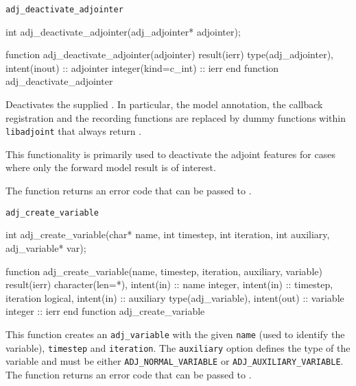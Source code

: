 \begin{boxwithtitle}{\texttt{adj_deactivate_adjointer}}
\begin{minipage}{\columnwidth}
\begin{ccode}
  int adj_deactivate_adjointer(adj_adjointer* adjointer);
\end{ccode}
\begin{fortrancode}
  function adj_deactivate_adjointer(adjointer) result(ierr) 
    type(adj_adjointer), intent(inout) :: adjointer
    integer(kind=c_int) :: ierr
  end function adj_deactivate_adjointer
\end{fortrancode}
\end{minipage}
\end{boxwithtitle}

Deactivates the supplied .
In particular, the model annotation, the callback registration and the recording functions are replaced by dummy functions within \texttt{libadjoint} that always return .

This functionality is primarily used to deactivate the adjoint features for cases where only the forward model result is of interest.

The function returns an error code that can be passed to .


\begin{boxwithtitle}{\texttt{adj_create_variable}}
\begin{minipage}{\columnwidth}
\begin{ccode}
  int adj_create_variable(char* name, int timestep, int iteration, int auxiliary, 
                          adj_variable* var);
\end{ccode}
\begin{fortrancode}
  function adj_create_variable(name, timestep, iteration, auxiliary, variable) 
           result(ierr)
    character(len=*), intent(in) :: name
    integer, intent(in) :: timestep, iteration
    logical, intent(in) :: auxiliary
    type(adj_variable), intent(out) :: variable
    integer :: ierr
  end function adj_create_variable
\end{fortrancode}
\end{minipage}
\end{boxwithtitle}

This function creates an \texttt{adj_variable} with the given \texttt{name} (used to identify the variable), \texttt{timestep} and \texttt{iteration}.
The \texttt{auxiliary} option defines the type of the variable and must be either \texttt{ADJ_NORMAL_VARIABLE} or \texttt{ADJ_AUXILIARY_VARIABLE}.
The function returns an error code that can be passed to .

